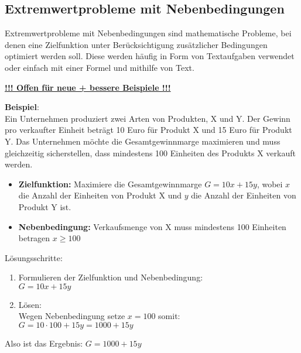 \subsection{Extremwertprobleme mit Nebenbedingungen}
Extremwertprobleme mit Nebenbedingungen sind mathematische Probleme, 
bei denen eine Zielfunktion unter Berücksichtigung zusätzlicher Bedingungen optimiert werden soll. 
Diese werden häufig in Form von Textaufgaben verwendet oder einfach mit einer Formel und mithilfe von Text.
\par
\secspacebig
\underline{\textbf{!!! Offen für neue + bessere Beispiele !!!}} 
\par
\textbf{Beispiel}: \\
Ein Unternehmen produziert zwei Arten von Produkten, X und Y. 
Der Gewinn pro verkaufter Einheit beträgt 10 Euro für Produkt X und 15 Euro für Produkt Y. 
Das Unternehmen möchte die Gesamtgewinnmarge maximieren und muss gleichzeitig sicherstellen, 
dass mindestens 100 Einheiten des Produkts X verkauft werden.
\begin{itemize}
    \item \textbf{Zielfunktion:} Maximiere die Gesamtgewinnmarge $G = 10x + 15y$, 
        wobei $x$ die Anzahl der Einheiten von Produkt X und $y$ die Anzahl der Einheiten von Produkt Y ist.
    \item \textbf{Nebenbedingung:} Verkaufsmenge von X muss mindestens 100 Einheiten betragen $x \geq 100$
\end{itemize}
Lösungsschritte:
\begin{enumerate}
    \item Formulieren der Zielfunktion und Nebenbedingung: \\
        $G = 10x + 15y$
    \item Lösen: \\
        Wegen Nebenbedingung setze $x = 100$ somit: \\
        $G = 10 \cdot 100 + 15y = 1000 + 15y$
\end{enumerate}
Also ist das Ergebnis: $G = 1000 + 15y$ \\\\
\
